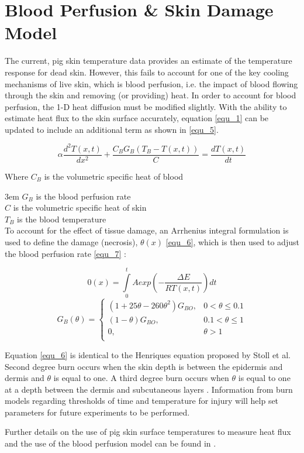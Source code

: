 \clearpage
\chapter{Blood Perfusion \& Skin Damage Model} \label{App:blood_perfusion}

The current, pig skin temperature data provides an estimate of the temperature response for dead skin. However, this fails to account for one of the key cooling mechanisms of live skin, which is blood perfusion, i.e. the impact of blood flowing through the skin and removing (or providing) heat. In order to account for blood perfusion, the 1-D heat diffusion must be modified slightly. With the ability to estimate heat flux to the skin surface accurately, equation \ref{equ_1} can be updated to include an additional term as shown in \ref{equ_5}.

\begin{equation} \label{equ_5} \alpha \frac{d^2T(x,t)}{dx^2} + \frac{C_BG_B(T_B-T(x,t))}{C} = \frac{dT(x,t)}{dt} \end{equation}

Where $C_B$ is the volumetric specific heat of blood

\noindent\hangindent3em
$G_B$ is the blood perfusion rate\\
$C$ is the volumetric specific heat of skin\\
$T_B$ is the blood temperature\\

To account for the effect of tissue damage, an Arrhenius integral formulation is used to define the damage (necrosis), $\theta(x)$ \ref{equ_6}, which is then used to adjust the blood perfusion rate \ref{equ_7} \cite{Torvi_Dale, Abraham_Sparrow}:

\begin{equation} \label{equ_6} 0(x) = \int\limits_0^t A exp(-\frac{\Delta E}{RT(x,t)}) dt \end{equation}
\begin{equation} \label{equ_7} G_B(\theta) = 
\begin{cases}
(1+25\theta-260\theta^2)G_{BO}, 	& 0 < \theta \leq 0.1 \\
(1-\theta)G_{BO},					& 0.1 < \theta \leq 1 \\
0, 									& \theta > 1\\
\end{cases}
\end{equation}

Equation \ref{equ_6} is identical to the Henriques equation proposed by Stoll et al. Second degree burn occurs when the skin depth is between the epidermis and dermis and $\theta$ is equal to one. A third degree burn occurs when $\theta$ is equal to one at a depth between the dermis and subcutaneous layers \cite{Time_Temperature_Cutaneous_Burns}. Information from burn models regarding thresholds of time and temperature for injury will help set parameters for future experiments to be performed.

Further details on the use of pig skin surface temperatures to measure heat flux and the use of the blood perfusion model can be found in \cite{Residential_Tenability}.


